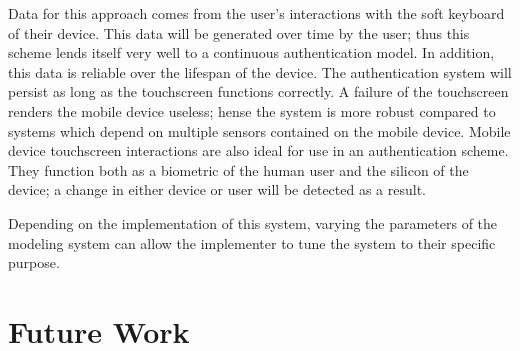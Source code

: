 \documentclass{acm_proc_article-sp}
\begin{document}
Data for this approach comes from the user's interactions with the soft keyboard of their device. This data will be generated over time by the user; thus this scheme lends itself very well to a continuous authentication model. In addition, this data is reliable over the lifespan of the device. The authentication system will persist as long as the touchscreen functions correctly. A failure of the touchscreen renders the mobile device useless; hense the system is more robust compared to systems which depend on multiple sensors contained on the mobile device.
Mobile device touchscreen interactions are also ideal for use in an authentication scheme. They function both as a biometric of the human user and the silicon of the device; a change in either device or user will be detected as a result.

Depending on the implementation of this system, varying the parameters of the modeling system can allow the implementer to tune the system to their specific purpose. 

\section{Future Work}
\label{sec:futurework}



\end{document}
